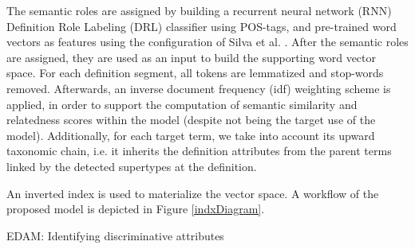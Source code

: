 \documentclass[11pt,a4paper]{article}
\begin{document}
The semantic roles are assigned by building a recurrent neural network (RNN) Definition Role Labeling (DRL) classifier using POS-tags, and pre-trained word vectors as features using the configuration of Silva et al. . After the semantic roles are assigned, they are used as an input to build the supporting word vector space. For each definition segment, all tokens are lemmatized and stop-words removed. Afterwards, an inverse document frequency (idf) weighting scheme is applied, in order to support the computation of semantic similarity and relatedness scores within the model (despite not being the target use of the model). Additionally, for each target term, we take into account its upward taxonomic chain, i.e. it inherits the definition attributes from the parent terms linked by the detected supertypes at the definition. 

An inverted index is used to materialize the vector space. A workflow of the proposed model is depicted in Figure \ref{indxDiagram}.

\begin{algorithm}
 	\caption{EDAM: Identifying discriminative attributes}
     \label{alg:comb}
    \begin{algorithmic}
            \RETURN
          \ENDIF
        
            \RETURN
          \ENDIF
        




    \end{algorithmic}
\end{algorithm}
\end{document}
